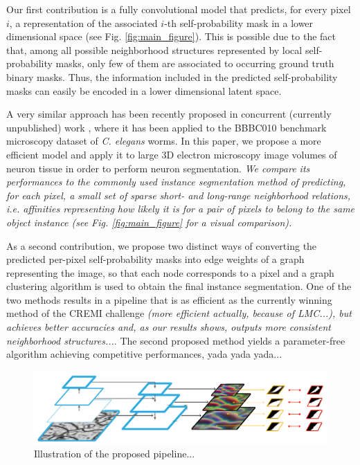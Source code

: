 Our first contribution is a fully convolutional model that predicts, for every pixel $i$, a representation of the associated $i$-th self-probability mask in a lower dimensional space (see Fig. \ref{fig:main_figure}). This is possible due to the fact that, among all possible neighborhood structures represented by local self-probability masks, only few of them are associated to occurring ground truth binary masks. Thus, the information included in the predicted self-probability masks can easily be encoded in a lower dimensional latent space. 

A very similar approach has been recently proposed in concurrent (currently unpublished) work \cite{hirsch2020patchperpix}, where it has been applied to the BBBC010 benchmark microscopy dataset of \emph{C. elegans} worms. In this paper, we propose a more efficient model and apply it to large 3D electron microscopy image volumes of neuron tissue in order to perform neuron segmentation. 
\emph{We compare its performances to the commonly used instance segmentation method of predicting, for each pixel, a small set of sparse short- and long-range neighborhood relations, i.e. affinities representing how likely it is for a pair of pixels to belong to the same object instance (see Fig. \ref{fig:main_figure} for a visual comparison).}

As a second contribution, we propose two distinct ways of converting the predicted per-pixel self-probability masks into edge weights of a graph representing the image, so that each node corresponds to a pixel and a graph clustering algorithm is used to obtain the final instance segmentation.
One of the two methods results in a pipeline that is as efficient as the currently winning method of the CREMI challenge \emph{(more efficient actually, because of LMC...), but achieves better accuracies and, as our results shows, outputs more consistent neighborhood structures...}.
The second proposed method yields a parameter-free algorithm achieving competitive performances, yada yada yada... 

\begin{figure}[t]
\centering
        \includegraphics[width=\textwidth]{./figs/main_image.pdf} %
        \caption{Illustration of the proposed pipeline...}
    \label{fig:alg_explained}
\end{figure}


